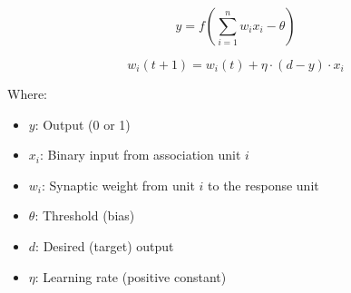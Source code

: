 
\begin{equation}
\boxed{y = f\left( \sum_{i=1}^{n} w_i x_i - \theta \right)}
\end{equation}

\begin{equation}
\boxed{w_i(t+1) = w_i(t) + \eta \cdot (d - y) \cdot x_i}
\end{equation}

Where:
\begin{itemize}
    \item $y$: Output (0 or 1)
    \item $x_i$: Binary input from association unit $i$
    \item $w_i$: Synaptic weight from unit $i$ to the response unit
    \item $\theta$: Threshold (bias)
    \item $d$: Desired (target) output
    \item $\eta$: Learning rate (positive constant)
\end{itemize}
